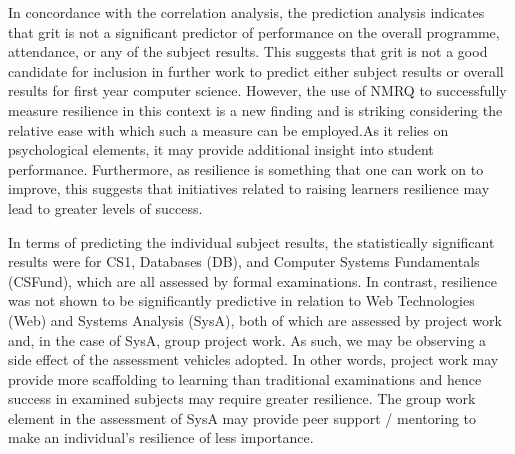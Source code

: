 \documentclass[sigconf]{acmart}
\begin{document}
In concordance with the correlation analysis, the prediction analysis indicates that grit is not a significant predictor of performance on the overall programme, attendance, or any of the subject results. This suggests that grit is not a good candidate for inclusion in further work to predict either subject results or overall results for first year computer science.  However, the use of NMRQ to successfully measure resilience in this context is a new finding and is striking considering the relative ease with which such a measure can be employed.As it relies on psychological elements, it may provide additional insight into student performance. Furthermore, as resilience is something that one can work on to improve, this suggests that initiatives related to raising learners resilience may lead to greater levels of success. 



In terms of predicting the individual subject results, the statistically significant results were for CS1, Databases (DB), and Computer Systems Fundamentals (CSFund), which are all assessed by formal examinations. In contrast, resilience was not shown to be significantly predictive in relation to Web Technologies (Web) and Systems Analysis (SysA), both of which are assessed by project work and, in the case of SysA, group project work. As such, we may be observing a side effect of the assessment vehicles adopted. In other words, project work may provide more scaffolding to learning than traditional examinations and hence success in examined subjects may require greater resilience. The group work element in the assessment of SysA may provide peer support / mentoring to make an individual's resilience of less importance.    
\end{document}
